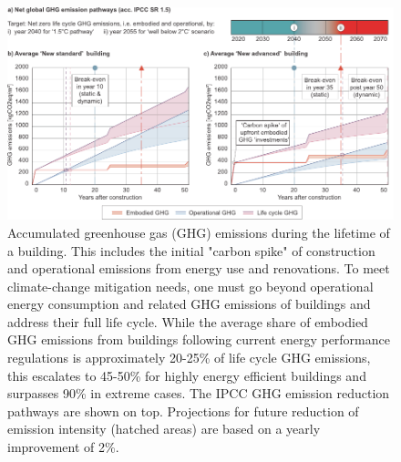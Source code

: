 \documentclass[a4paper]{article}
\begin{document}
\begin{figure}[ht!]
    \centering
    \includegraphics[width=\textwidth]{figures/emissions.pdf}
    \caption{Accumulated greenhouse gas (GHG) emissions during the lifetime of a building. This includes the initial "carbon spike" of construction and operational emissions from energy use and renovations. To meet climate-change mitigation needs, one must go beyond operational energy consumption and related GHG emissions of buildings and address their full life cycle. While the average share of embodied GHG emissions from buildings following current energy performance regulations is approximately 20-25\% of life cycle GHG emissions, this escalates to 45-50\% for highly energy efficient buildings and surpasses 90\% in extreme cases. The IPCC GHG emission reduction pathways are shown on top. Projections for future reduction of emission intensity (hatched areas) are based on a yearly improvement of 2\%.}
    \label{fig:lca}
\end{figure}




\clearpage
\printbibliography
\end{document}
